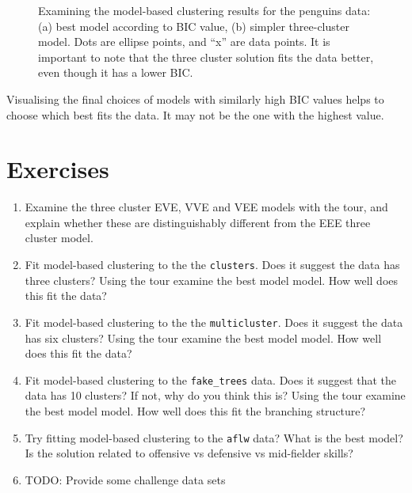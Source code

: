 \documentclass[
  letterpaper,
]{book}
\providecommand{\tightlist}{%
  \setlength{\itemsep}{0pt}\setlength{\parskip}{0pt}}\usepackage{longtable,booktabs,array}
\begin{document}
\begin{figure}

\begin{minipage}[t]{0.50\linewidth}

{\centering 

}

\end{minipage}%

\caption{\label{fig-penguins-mc}Examining the model-based clustering
results for the penguins data: (a) best model according to BIC value,
(b) simpler three-cluster model. Dots are ellipse points, and ``x'' are
data points. It is important to note that the three cluster solution
fits the data better, even though it has a lower BIC.}

\end{figure}

Visualising the final choices of models with similarly high BIC values
helps to choose which best fits the data. It may not be the one with the
highest value.

\hypertarget{exercises-8}{%
\section*{Exercises}\label{exercises-8}}


\begin{enumerate}
\def\labelenumi{\arabic{enumi}.}
\tightlist
\item
  Examine the three cluster EVE, VVE and VEE models with the tour, and
  explain whether these are distinguishably different from the EEE three
  cluster model.
\item
  Fit model-based clustering to the the \texttt{clusters}. Does it
  suggest the data has three clusters? Using the tour examine the best
  model model. How well does this fit the data?
\item
  Fit model-based clustering to the the \texttt{multicluster}. Does it
  suggest the data has six clusters? Using the tour examine the best
  model model. How well does this fit the data?
\item
  Fit model-based clustering to the \texttt{fake\_trees} data. Does it
  suggest that the data has 10 clusters? If not, why do you think this
  is? Using the tour examine the best model model. How well does this
  fit the branching structure?
\item
  Try fitting model-based clustering to the \texttt{aflw} data? What is
  the best model? Is the solution related to offensive vs defensive vs
  mid-fielder skills?
\item
  TODO: Provide some challenge data sets
\end{enumerate}
\end{document}
